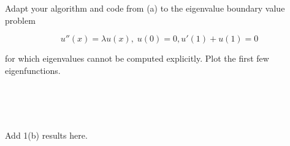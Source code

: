Adapt your algorithm and code from (a) to the eigenvalue boundary value problem

$$
u''(x) = \lambda u(x), \; u(0) = 0, u'(1) + u(1) = 0
$$

for which eigenvalues cannot be computed explicitly. Plot the first few eigenfunctions.

\begin{solution}\ \\\\
    \ \\
    \newpage
    \hfill\vfill

    \pagebreak
    Add 1(b) results here.
\end{solution}